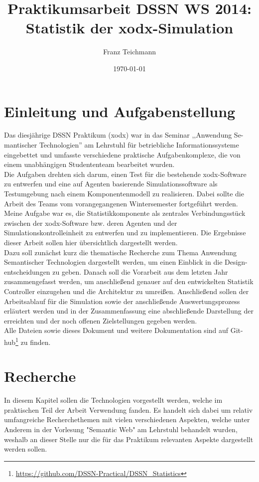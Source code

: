 \documentclass{article}
\title{Praktikumsarbeit DSSN WS 2014: \\ Statistik der xodx-Simulation}
\author{Franz Teichmann}
\date{\today}
\begin{document}
\maketitle

\tableofcontents
\newpage

\section{Einleitung und Aufgabenstellung}

Das diesjährige DSSN Praktikum (xodx) war in das Seminar ,,Anwendung Se-mantischer Technologien'' am Lehrstuhl für betriebliche Informationssysteme eingebettet und umfasste verschiedene praktische Aufgabenkomplexe, die von einem unabhängigen Studententeam bearbeitet wurden.\\
Die Aufgaben drehten sich darum, einen Test für die bestehende xodx-Software zu entwerfen und eine auf Agenten basierende Simulationssoftware als Testumgebung nach einem Komponentenmodell zu realisieren. Dabei sollte die Arbeit des Teams vom vorangegangenen Wintersemester fortgeführt werden.\\
Meine Aufgabe war es, die Statistikkomponente als zentrales Verbindungsstück zwischen der xodx-Software bzw. deren Agenten und der Simulationskontrolleinheit zu entwerfen und zu implementieren. Die Ergebnisse dieser Arbeit sollen hier übersichtlich dargestellt werden.\\
Dazu soll zunächst kurz die thematische Recherche zum Thema Anwendung Semantischer Technologien dargestellt werden, um einen Einblick in die Design-entscheidungen zu geben. Danach soll die Vorarbeit aus dem letzten Jahr zusammengefasst werden, um anschließend genauer auf den entwickelten Statistik Controller einzugehen und die Architektur zu umreißen. Anschließend sollen der Arbeitsablauf für die Simulation sowie der anschließende Auswertungsprozess erläutert werden und in der Zusammenfassung eine abschließende Darstellung der erreichten und der noch offenen Zielstellungen gegeben werden.\\
Alle Dateien sowie dieses Dokument und weitere Dokumentation sind auf Git-hub\footnote{\url{https://github.com/DSSN-Practical/DSSN_Statistics}} zu finden.

\section{Recherche}

In diesem Kapitel sollen die Technologien vorgestellt werden, welche im praktischen Teil der Arbeit Verwendung fanden. Es handelt sich dabei um relativ umfangreiche Recherchethemen mit vielen verschiedenen Aspekten, welche unter Anderem in der Vorlesung "Semantic Web" am Lehrstuhl behandelt wurden, weshalb an dieser Stelle nur die für das Praktikum relevanten Aspekte dargestellt werden sollen.
\end{document}
